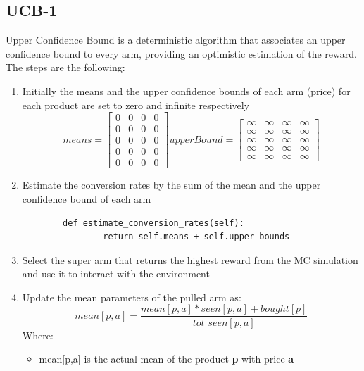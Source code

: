 \subsection{UCB-1}
Upper Confidence Bound is a deterministic algorithm that associates an upper confidence bound to every arm, providing an optimistic estimation of the reward.
The steps are the following:
\begin{enumerate}
    \item Initially the means and the upper confidence bounds of each arm (price) for each product are set to zero and infinite respectively \[ means=
    \begin{bmatrix}
            0 & 0 & 0 & 0\\
            0 & 0 & 0 & 0\\
            0 & 0 & 0 & 0\\
            0 & 0 & 0 & 0\\
            0 & 0 & 0 & 0
    \end{bmatrix}upperBound=
    \begin{bmatrix}
            \infty & \infty & \infty & \infty\\
            \infty & \infty & \infty & \infty\\
            \infty & \infty & \infty & \infty\\
            \infty & \infty & \infty & \infty\\
            \infty & \infty & \infty & \infty
    \end{bmatrix}
    \]
    \item Estimate the conversion rates by the sum of the mean and the upper confidence bound of each arm\begin{verbatim}
        def estimate_conversion_rates(self):
                return self.means + self.upper_bounds
        \end{verbatim}
    \item Select the super arm that returns the highest reward from the MC simulation and use it to interact with the environment
    \item Update the mean parameters of the pulled arm as:\begin{equation}
            mean[p,a] = \frac{mean[p,a] * seen[p,a] + bought[p]}{tot\_seen[p,a]}
        \end{equation}Where:
        \begin{itemize}
            \item mean[p,a] is the actual mean of the product {\bf p} with price {\bf a}

\end{itemize}
\end{enumerate}
